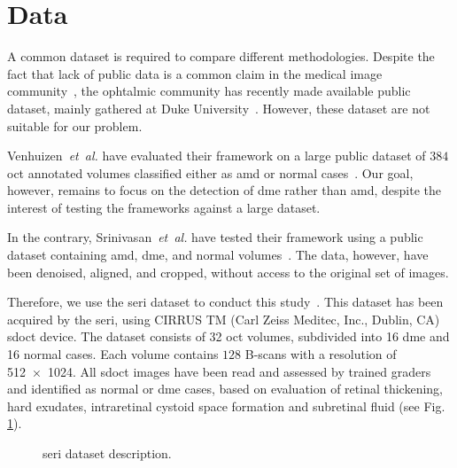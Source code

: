 \graphicspath{ {./content/method/figures/} }

\section{Data}\label{sec:data}
A common dataset is required to compare different methodologies.
Despite the fact that lack of public data is a common claim in the medical image community~\cite{giger2008anniversary}, the ophtalmic community has recently made available public dataset, mainly gathered at Duke University~\cite{farsiu2014quantitative,Srinivasan2014}.
However, these dataset are not suitable for our problem.

Venhuizen~\emph{et~al.} have evaluated their framework on a large public dataset of $384$ \gls{oct} annotated volumes classified either as \gls{amd} or normal cases~\cite{Venhuizen2015}.
Our goal, however, remains to focus on the detection of \gls{dme} rather than \gls{amd}, despite the interest of testing the frameworks against a large dataset.

In the contrary, Srinivasan~\emph{et~al.} have tested their framework using a public dataset containing \gls{amd}, \gls{dme}, and normal volumes~\cite{Srinivasan2014}.
The data, however, have been denoised, aligned, and cropped, without access to the original set of images.

Therefore, we use the \gls{seri} dataset to conduct this study~\cite{seri2016apr-repoICPR}.
This dataset has been acquired by the \gls{seri}, using CIRRUS TM (Carl Zeiss Meditec, Inc., Dublin, CA) \gls{sdoct} device.
The dataset consists of 32 \gls{oct} volumes, subdivided into 16 \gls{dme} and 16 normal cases.
Each volume contains $128$ B-scans with a resolution of \SI[product-units=repeat]{512x1024}{\px}.
All \gls{sdoct} images have been read and assessed by trained graders and identified as normal or \gls{dme} cases, based on evaluation of retinal thickening, hard exudates, intraretinal cystoid space formation and subretinal fluid (see Fig.\,\ref{fig:bbdd}).

\begin{figure}
    \caption{\gls{seri} dataset description.}
  \label{fig:bbdd}
\end{figure}
